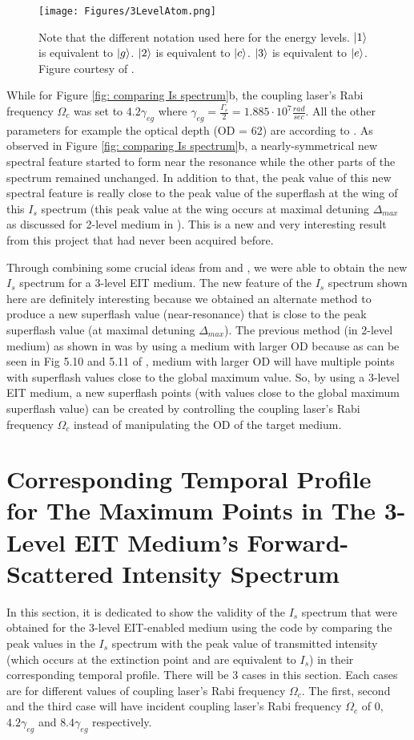 \begin{figure}[h!]
    \centering
    \texttt{[image: Figures/3LevelAtom.png]}
    \caption{Note that the different notation used here for the energy levels. $\ket{1}$ is equivalent to $\ket{g}$. $\ket{2}$ is equivalent to $\ket{c}$. $\ket{3}$ is equivalent to $\ket{e}$. Figure courtesy of \cite{Jeong2009}.}
    \label{fig: 3LevelAtom}
\end{figure}

While for Figure \ref{fig: comparing Is spectrum}b, the coupling laser's Rabi frequency $\Omega_{c}$ was set to $4.2\gamma_{eg}$ where $\gamma_{eg} = \frac{\Gamma_{e}}{2} = 1.885 \cdot 10^{7} \frac{rad}{sec}$. All the other parameters for example the optical depth (OD = 62) are according to \cite{jeong2010slow}. As observed in Figure \ref{fig: comparing Is spectrum}b, a nearly-symmetrical new spectral feature started to form near the resonance while the other parts of the spectrum remained unchanged. In addition to that, the peak value of this new spectral feature is really close to the peak value of the superflash at the wing of this $I_{s}$ spectrum (this peak value at the wing occurs at maximal detuning $\Delta_{max}$ as discussed for 2-level medium in \cite{Kwong2017}). This is a new and very interesting result from this project that had never been acquired before.

Through combining some crucial ideas from \cite{Kwong2014} and \cite{jeong2010slow}, we were able to obtain the new $I_{s}$ spectrum for a 3-level EIT medium. The new feature of the $I_{s}$ spectrum shown here are definitely interesting because we obtained an alternate method to produce a new superflash value (near-resonance) that is close to the peak superflash value (at maximal detuning $\Delta_{max}$). The previous method (in 2-level medium) as shown in \cite{Kwong2017} was by using a medium with larger OD because as can be seen in Fig 5.10 and 5.11 of \cite{Kwong2017}, medium with larger OD will have multiple points with superflash values close to the global maximum value. So, by using a 3-level EIT medium, a new superflash points (with values close to the global maximum superflash value) can be created by controlling the coupling laser's Rabi frequency $\Omega_{c}$ instead of manipulating the OD of the target medium.


\section{Corresponding Temporal Profile for The Maximum Points in The 3-Level EIT Medium's Forward-Scattered Intensity Spectrum}
In this section, it is dedicated to show the validity of the $I_{s}$ spectrum that were obtained for the 3-level EIT-enabled medium using the code by comparing the peak values in the $I_{s}$ spectrum with the peak value of transmitted intensity (which occurs at the extinction point and are equivalent to $I_{s}$) in their corresponding temporal profile. There will be 3 cases in this section. Each cases are for different values of coupling laser's Rabi frequency $\Omega_{c}$. The first, second and the third case will have incident coupling laser's Rabi frequency $\Omega_{c}$ of $0$, $4.2\gamma_{eg}$ and $8.4\gamma_{eg}$ respectively.

